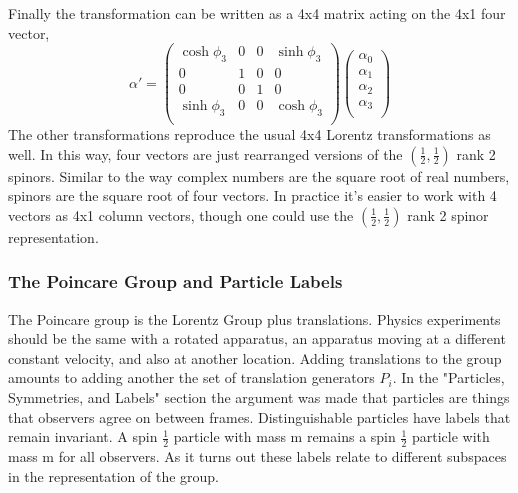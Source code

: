 Finally the transformation can be written as a 4x4 matrix acting on the 4x1 four vector,
\begin{equation}
\alpha' = 
\begin{pmatrix}
\cosh\phi_3 & 0 & 0 & \sinh\phi_3 \\
0 & 1 & 0 & 0 \\
0 & 0 & 1 & 0 \\
\sinh\phi_3 & 0 & 0 & \cosh\phi_3 \\
\end{pmatrix}
\begin{pmatrix}
\alpha_0 \\
\alpha_1 \\
\alpha_2 \\
\alpha_3 \\
\end{pmatrix}
\end{equation}
The other transformations reproduce the usual 4x4 Lorentz transformations as well. In this way, four vectors are just rearranged versions of the $(\frac{1}{2}, \frac{1}{2})$ rank 2 spinors. Similar to the way complex numbers are the square root of real numbers, spinors are the square root of four vectors. In practice it's easier to work with 4 vectors as 4x1 column vectors, though one could use the $(\frac{1}{2}, \frac{1}{2})$ rank 2 spinor representation.  

\subsubsection{The Poincare Group and Particle Labels}

The Poincare group is the Lorentz Group plus translations. Physics experiments should be the same with a rotated apparatus, an apparatus moving at a different constant velocity, and also at another location. Adding translations to the group amounts to adding another the set of translation generators $P_i$. In the "Particles, Symmetries, and Labels" section the argument was made that particles are things that observers agree on between frames. Distinguishable particles have labels that remain invariant. A spin $\frac{1}{2}$ particle with mass m remains a spin $\frac{1}{2}$ particle with mass m for all observers. As it turns out these labels relate to different subspaces in the representation of the group.

